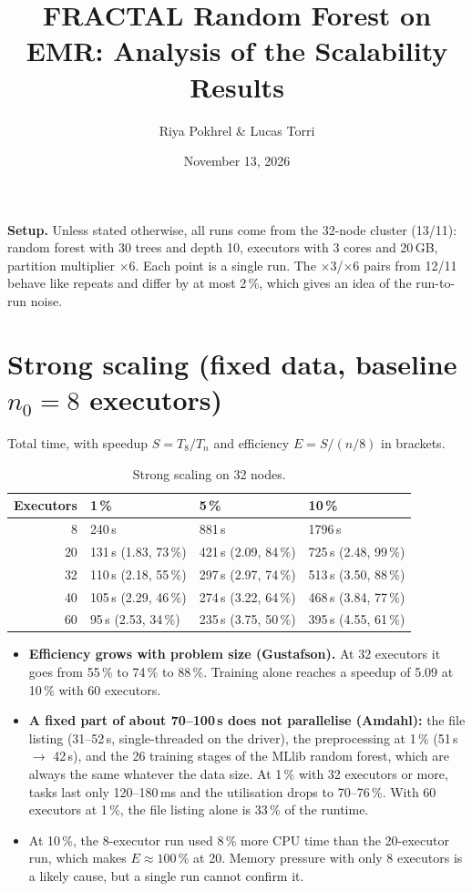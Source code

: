 \documentclass[a4paper, 11pt]{article}
\title{\textbf{FRACTAL Random Forest on EMR: Analysis of the Scalability Results}}
\author{Riya Pokhrel \& Lucas Torri}
\date{November 13, 2026}
\begin{document}
\maketitle


\noindent\textbf{Setup.} Unless stated otherwise, all runs come from the 32-node cluster (13/11):
random forest with 30 trees and depth 10, executors with 3 cores and 20\,GB, partition multiplier $\times 6$.
Each point is a single run. The $\times 3$/$\times 6$ pairs from 12/11 behave like repeats and differ by
at most 2\,\%, which gives an idea of the run-to-run noise.

\section{Strong scaling (fixed data, baseline $n_0 = 8$ executors)}

Total time, with speedup $S = T_8/T_n$ and efficiency $E = S/(n/8)$ in brackets.

\begin{table}[H]
\centering
\begin{tabular}{rlll}
\toprule
Executors & 1\,\% & 5\,\% & 10\,\% \\
\midrule
8  & 240\,s & 881\,s & 1796\,s \\
20 & 131\,s (1.83, 73\,\%) & 421\,s (2.09, 84\,\%) & 725\,s (2.48, 99\,\%) \\
32 & 110\,s (2.18, 55\,\%) & 297\,s (2.97, 74\,\%) & 513\,s (3.50, 88\,\%) \\
40 & 105\,s (2.29, 46\,\%) & 274\,s (3.22, 64\,\%) & 468\,s (3.84, 77\,\%) \\
60 & 95\,s (2.53, 34\,\%)  & 235\,s (3.75, 50\,\%) & 395\,s (4.55, 61\,\%) \\
\bottomrule
\end{tabular}
\caption{Strong scaling on 32 nodes.}
\end{table}

\begin{itemize}
  \item \textbf{Efficiency grows with problem size (Gustafson).} At 32 executors it goes from
  55\,\% to 74\,\% to 88\,\%. Training alone reaches a speedup of 5.09 at 10\,\% with 60 executors.
  \item \textbf{A fixed part of about 70--100\,s does not parallelise (Amdahl):} the file listing
  (31--52\,s, single-threaded on the driver), the preprocessing at 1\,\% (51\,s $\rightarrow$ 42\,s), and the
  26 training stages of the MLlib random forest, which are always the same whatever the data size.
  At 1\,\% with 32 executors or more, tasks last only 120--180\,ms and the utilisation drops to 70--76\,\%.
  With 60 executors at 1\,\%, the file listing alone is 33\,\% of the runtime.
  \item At 10\,\%, the 8-executor run used 8\,\% more CPU time than the 20-executor run, which makes
  $E \approx 100\,\%$ at 20. Memory pressure with only 8 executors is a likely cause, but a single run
  cannot confirm it.
\end{itemize}
\end{document}
